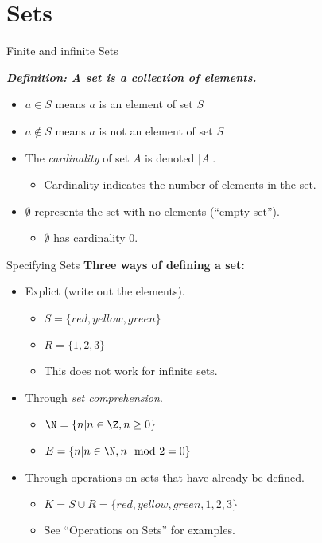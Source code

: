 \section[slide=true,tocsection=false]{Sets}

\begin{slide}[bm=,toc=]{Finite and infinite Sets}

\emph{\textbf{Definition: A set is a collection of elements.}}
\pause
\begin{itemize}
   \item<2-> $a \in S$ means $a$ is an element of set $S$ 
   \item<3-> $a \notin S$ means $a$ is not an element of set $S$
   \item<4-> The \emph{cardinality} of set $A$ is denoted $|A|$. 
   \begin{itemize}
       \item<5-> Cardinality indicates the number of elements in the set.
   \end{itemize}
   \item<6-> $\emptyset$ represents the set with no elements (``empty set'').
   \begin{itemize}
       \item<7-> $\emptyset$ has cardinality 0. 
   \end{itemize}
\end{itemize} 
\end{slide}

\begin{slide}[bm=,toc=]{Specifying Sets}
\textbf{Three ways of defining a set:}
\begin{itemize}
   \item<2-> Explict (write out the elements).
   \begin{itemize}
      \item<3-> $S = \{red, yellow, green\}$ 
      \item<4-> $R = \{1,2,3\}$
      \item<5-> This does not work for infinite sets.
   \end{itemize} 
   \item<6-> Through \emph{set comprehension}. 
   \begin{itemize}
      \item<7-> $\N = \{n| n \in \Z, n \geq 0\}$ 
      \item<8-> $E = \{n| n \in \N, n \mod{2} = 0 \}$
   \end{itemize}
   \item<9-> Through operations on sets that have already be defined. 
   \begin{itemize}
      \item<10-> $K = S \cup R = \{red, yellow, green, 1, 2, 3\}$ 
      \item<11-> See ``Operations on Sets'' for examples. 
   \end{itemize}
\end{itemize} 

\end{slide}


